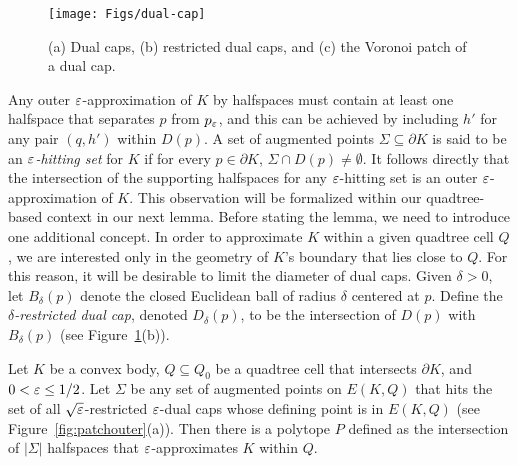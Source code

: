 \documentclass[11pt]{article}   \usepackage[letterpaper,hmargin=2.1cm,vmargin=3cm]{geometry}
\begin{document}
\begin{figure}[htbp]
  \centerline{\texttt{[image: Figs/dual-cap]}}
  \caption{(a) Dual caps, (b) restricted dual caps, and (c) the Voronoi patch of a dual cap.}
  \label{fig:dual-cap}
\end{figure}


Any outer $\varepsilon$-approximation of $K$ by halfspaces must contain at least one halfspace that separates $p$ from $p_{\varepsilon}$, and this can be achieved by including $h'$ for any pair $(q,h')$ within $D(p)$. A set of augmented points $\Sigma \subseteq \partial K$ is said to be an \emph{$\varepsilon$-hitting set} for $K$ if for every $p \in \partial K$, $\Sigma \cap D(p) \ne \emptyset$. It follows directly that the intersection of the supporting halfspaces for any $\varepsilon$-hitting set is an outer $\varepsilon$-approximation of $K$. This observation will be formalized within our quadtree-based context in our next lemma. Before stating the lemma, we need to introduce one additional concept. In order to approximate $K$ within a given quadtree cell $Q$, we are interested only in the geometry of $K$'s boundary that lies close to $Q$. For this reason, it will be desirable to limit the diameter of dual caps. Given $\delta > 0$, let $B_{\delta}(p)$ denote the closed Euclidean ball of radius $\delta$ centered at $p$. Define the \emph{$\delta$-restricted dual cap}, denoted $D_{\delta}(p)$, to be the intersection of $D(p)$ with $B_{\delta}(p)$ (see Figure~\ref{fig:dual-cap}(b)).

\begin{lemma} \label{lem:patchouter}
Let $K$ be a convex body, $Q \subseteq Q_0$ be a quadtree cell that intersects $\partial K$, and $0 < \varepsilon \le 1/2$. Let $\Sigma$ be any set of augmented points on $E(K,Q)$ that hits the set of all $\sqrt{\varepsilon}$-restricted $\varepsilon$-dual caps whose defining point is in $E(K,Q)$ (see Figure~\ref{fig:patchouter}(a)). Then there is a polytope $P$ defined as the intersection of $|\Sigma|$ halfspaces that $\varepsilon$-approximates $K$ within $Q$.
\end{lemma}
\end{document}
